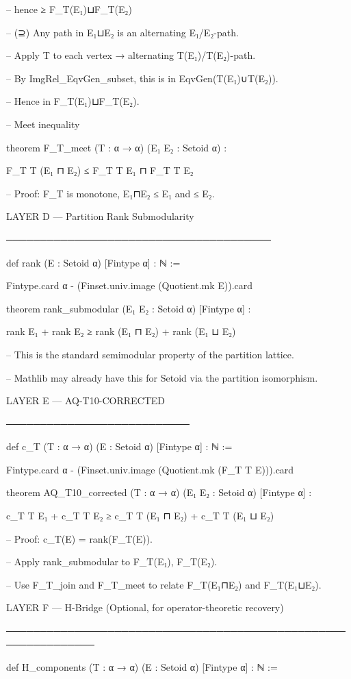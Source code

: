 --     hence ≥ F_T(E₁)⊔F_T(E₂)

-- (⊇) Any path in E₁⊔E₂ is an alternating E₁/E₂-path.

--     Apply T to each vertex → alternating T(E₁)/T(E₂)-path.

--     By ImgRel_EqvGen_subset, this is in EqvGen(T(E₁)∪T(E₂)).

--     Hence in F_T(E₁)⊔F_T(E₂).


-- Meet inequality

theorem F_T_meet (T : α → α) (E₁ E₂ : Setoid α) :

F_T T (E₁ ⊓ E₂) ≤ F_T T E₁ ⊓ F_T T E₂


-- Proof: F_T is monotone, E₁⊓E₂ ≤ E₁ and ≤ E₂.


LAYER D — Partition Rank Submodularity

───────────────────────────────────────

def rank (E : Setoid α) [Fintype α] : ℕ :=

Fintype.card α - (Finset.univ.image (Quotient.mk E)).card


theorem rank_submodular (E₁ E₂ : Setoid α) [Fintype α] :

rank E₁ + rank E₂ ≥ rank (E₁ ⊓ E₂) + rank (E₁ ⊔ E₂)


-- This is the standard semimodular property of the partition lattice.

-- Mathlib may already have this for Setoid via the partition isomorphism.


LAYER E — AQ-T10-CORRECTED

───────────────────────────

def c_T (T : α → α) (E : Setoid α) [Fintype α] : ℕ :=

Fintype.card α - (Finset.univ.image (Quotient.mk (F_T T E))).card


theorem AQ_T10_corrected (T : α → α) (E₁ E₂ : Setoid α) [Fintype α] :

c_T T E₁ + c_T T E₂ ≥ c_T T (E₁ ⊓ E₂) + c_T T (E₁ ⊔ E₂)


-- Proof: c_T(E) = rank(F_T(E)).

-- Apply rank_submodular to F_T(E₁), F_T(E₂).

-- Use F_T_join and F_T_meet to relate F_T(E₁⊓E₂) and F_T(E₁⊔E₂).


LAYER F — H-Bridge (Optional, for operator-theoretic recovery)

───────────────────────────────────────────────────────────────

def H_components (T : α → α) (E : Setoid α) [Fintype α] : ℕ :=

